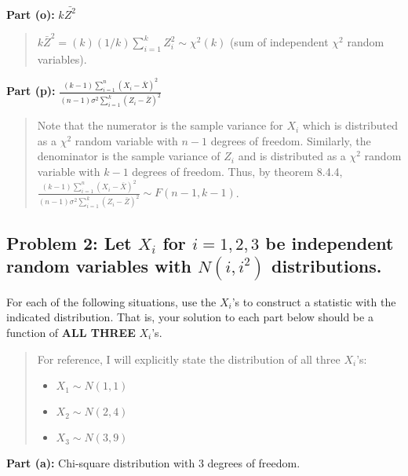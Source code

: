 \documentclass[
]{article}
\providecommand{\tightlist}{%
  \setlength{\itemsep}{0pt}\setlength{\parskip}{0pt}}
\begin{document}
\textbf{Part (o):} \(k\bar{Z^2}\)

\begin{quote}
\(k\bar{Z}^2 = (k)(1/k)\sum_{i = 1}^{k} Z_i^2 \sim \chi^2(k)\) (sum of
independent \(\chi^2\) random variables).
\end{quote}

\textbf{Part (p):}
\(\frac{(k - 1) \sum_{i = 1}^{n} (X_i - \bar{X})^2}{(n - 1)\sigma^2 \sum_{i = 1}^{k} (Z_i - \bar{Z})^2}\)

\begin{quote}
Note that the numerator is the sample variance for \(X_i\) which is
distributed as a \(\chi^2\) random variable with \(n - 1\) degrees of
freedom. Similarly, the denominator is the sample variance of \(Z_i\)
and is distributed as a \(\chi^2\) random variable with \(k - 1\)
degrees of freedom. Thus, by theorem 8.4.4,
\(\frac{(k - 1) \sum_{i = 1}^{n} (X_i - \bar{X})^2}{(n - 1)\sigma^2 \sum_{i = 1}^{k} (Z_i - \bar{Z})^2} \sim F(n - 1, k - 1)\).
\end{quote}

\hypertarget{problem-2-let-x_i-for-i-1-2-3-be-independent-random-variables-with-ni-i2-distributions.}{%
\subsection{\texorpdfstring{Problem 2: Let \(X_i\) for \(i = 1, 2, 3\)
be independent random variables with \(N(i, i^2)\)
distributions.}{Problem 2: Let X\_i for i = 1, 2, 3 be independent random variables with N(i, i\^{}2) distributions.}}\label{problem-2-let-x_i-for-i-1-2-3-be-independent-random-variables-with-ni-i2-distributions.}}

For each of the following situations, use the \(X_i\)'s to construct a
statistic with the indicated distribution. That is, your solution to
each part below should be a function of \textbf{ALL THREE} \(X_i\)'s.

\begin{quote}
For reference, I will explicitly state the distribution of all three
\(X_i\)'s:

\begin{itemize}
\tightlist
\item
  \(X_1 \sim N(1,1)\)
\item
  \(X_2 \sim N(2, 4)\)
\item
  \(X_3 \sim N(3, 9)\)
\end{itemize}
\end{quote}

\textbf{Part (a):} Chi-square distribution with 3 degrees of freedom.
\end{document}
